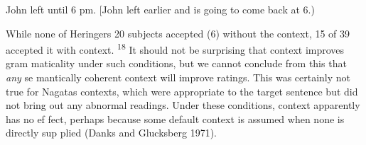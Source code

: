 \begin{listWWNumxxxleveli}
\item 
\begin{styleTextbody}
John left until 6 pm. [John left earlier and is going to come back at 6.)
\end{styleTextbody}


\end{listWWNumxxxleveli}
\begin{styleTextbody}
While none of Heringer{\textquotesingle}s 20 subjects accepted (6) without the context, 15 of 39 accepted it with context. \textsuperscript{18}\textsuperscript{ }It should not be surprising that context improves gram\- maticality under such conditions, but we cannot conclude from this that \textit{any}\textit{ }se\- mantically coherent context will improve ratings. This was certainly not true for Nagata{\textquotesingle}s contexts, which were appropriate to the target sentence but did not bring out any abnormal readings. Under these conditions, context apparently has no ef\- fect, perhaps because some default context is assumed when none is directly sup\- plied (Danks and Glucksberg 1971).
\end{styleTextbody}


